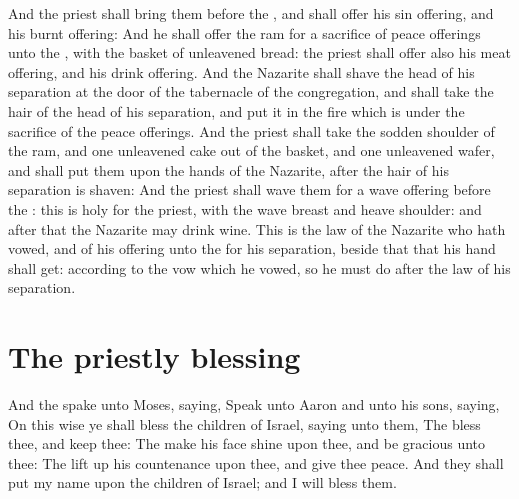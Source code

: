 \begin{biblechapter}
\verse And the priest shall bring them before the \LORD, and shall offer his sin offering, and his burnt offering:
\verse And he shall offer the ram for a sacrifice of peace offerings unto the \LORD, with the basket of unleavened bread: the priest shall offer also his meat offering, and his drink offering.
\verse And the Nazarite shall shave the head of his separation at the door of the tabernacle of the congregation, and shall take the hair of the head of his separation, and put it in the fire which is under the sacrifice of the peace offerings.
\verse And the priest shall take the sodden shoulder of the ram, and one unleavened cake out of the basket, and one unleavened wafer, and shall put them upon the hands of the Nazarite, after the hair of his separation is shaven:
\verse And the priest shall wave them for a wave offering before the \LORD: this is holy for the priest, with the wave breast and heave shoulder: and after that the Nazarite may drink wine.
\verse This is the law of the Nazarite who hath vowed, and of his offering unto the \LORD for his separation, beside that that his hand shall get: according to the vow which he vowed, so he must do after the law of his separation.
\section*{The priestly blessing}
\verse And the \LORD spake unto Moses, saying,
\verse Speak unto Aaron and unto his sons, saying, On this wise ye shall bless the children of Israel, saying unto them,
\verse The \LORD bless thee, and keep thee:
\verse The \LORD make his face shine upon thee, and be gracious unto thee:
\verse The \LORD lift up his countenance upon thee, and give thee peace.
\verse And they shall put my name upon the children of Israel; and I will bless them.
\end{biblechapter}

